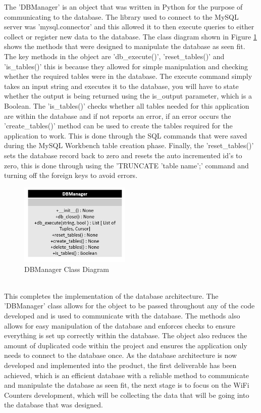 \documentclass{report}
\begin{document}
The 'DBManager' is an object that was written in Python for the purpose of communicating to the database. The library used to connect to the MySQL server was 'mysql.connector' and this allowed it to then execute queries to either collect or register new data to the database. The class diagram shown in Figure \ref{fig:class_diagram} shows the methods that were designed to manipulate the database as seen fit. The key methods in the object are 'db\_execute()', 'reset\_tables()' and 'is\_tables()' this is because they allowed for simple manipulation and checking whether the required tables were in the database. The execute command simply takes an input string and executes it to the database, you will have to state whether the output is being returned using the is\_output parameter, which is a Boolean. The 'is\_tables()' checks whether all tables needed for this application are within the database and if not reports an error, if an error occurs the  'create\_tables()' method can be used to create the tables required for the application to work. This is done through the SQL commands that were saved during the MySQL Workbench table creation phase. Finally, the 'reset\_tables()' sets the database record back to zero and resets the auto incremented id's to zero, this is done through using the 'TRUNCATE 'table name';' command and turning off the foreign keys to avoid errors. \\ \newline
\clearpage
\begin{figure}[h!]
    \centering
    \includegraphics[width=200]{dbmanager_class_diagram.PNG} 
    \caption{DBManager Class Diagram}
    \label{fig:class_diagram}
\end{figure} \\
This completes the implementation of the database architecture. The 'DBManager' class allows for the object to be passed throughout any of the code developed and is used to communicate with the database. The methods also allows for easy manipulation of the database and enforces checks to ensure everything is set up correctly within the database. The object also reduces the amount of duplicated code within the project and ensures the application only needs to connect to the database once. As the database architecture is now developed and implemented into the product, the first deliverable has been achieved, which is an efficient database with a reliable method to communicate and manipulate the database as seen fit, the next stage is to focus on the WiFi Counters development, which will be collecting the data that will be going into the database that was designed.
\end{document}
